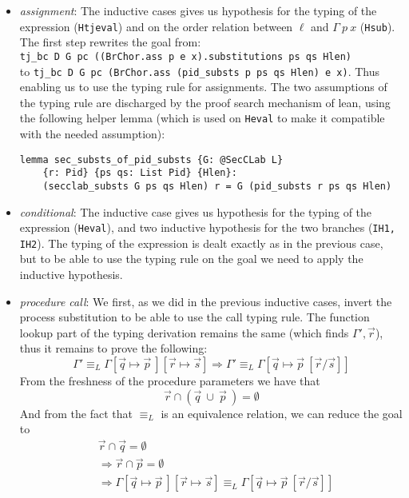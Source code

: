 \documentclass[12pt,a4paper,twoside]{book}
\begin{document}
\begin{itemize}
\item \emph{assignment}: The inductive cases gives us hypothesis for the typing of the expression (\texttt{Htjeval}) and on the order relation between $\ell$ and $\Gamma~p~x$ (\texttt{Hsub}).\\
The first step rewrites the goal from:\\
\texttt{tj\_bc D G pc ((BrChor.ass p e x).substitutions ps qs Hlen)}\\
to \texttt{tj\_bc D G pc (BrChor.ass (pid\_substs p ps qs Hlen) e x)}.
Thus enabling us to use the typing rule for assignments.
The two assumptions of the typing rule are discharged by the proof search mechanism of lean, using the following helper lemma (which is used on \texttt{Heval} to make it compatible with the needed assumption):
\begin{verbatim}
lemma sec_substs_of_pid_substs {G: @SecCLab L}
    {r: Pid} {ps qs: List Pid} {Hlen}:
    (secclab_substs G ps qs Hlen) r = G (pid_substs r ps qs Hlen)
\end{verbatim}
\item \emph{conditional}: The inductive case gives us hypothesis for the typing of the expression (\texttt{Heval}), and two inductive hypothesis for the two branches (\texttt{IH1,  IH2}).
The typing of the expression is dealt exactly as in the previous case, but to be able to use the typing rule on the goal we need to apply the inductive hypothesis.
\item \emph{procedure call}: We first, as we did in the previous inductive cases, invert the process substitution to be able to use the call typing rule. The function lookup part of the typing derivation remains the same (which finds $\Gamma', \vec{r}$), thus it remains to prove the following:
$$
\Gamma' \equiv_L \Gamma[\vec{q} \mapsto \vec{p}~][\vec{r} \mapsto \vec{s}]
\Longrightarrow 
\Gamma' \equiv_L \Gamma[\vec{q} \mapsto \vec{p}~[\vec{r}/\vec{s}]]
$$
From the freshness of the procedure parameters we have that
$$\vec{r} \cap (\vec{q} ~\cup ~\vec{p}~) = \emptyset$$
And from the fact that $\equiv_L$ is an equivalence relation, we can reduce the goal to
\begin{align*}
&\vec{r} \cap \vec{q} = \emptyset\\
&\Longrightarrow \vec{r} \cap \vec{p} = \emptyset\\
&\Longrightarrow \Gamma[\vec{q} \mapsto \vec{p}~][\vec{r} \mapsto \vec{s}]
\equiv_L \Gamma[\vec{q} \mapsto \vec{p}~[\vec{r}/\vec{s}]]
\end{align*}

\end{itemize}
\end{document}
